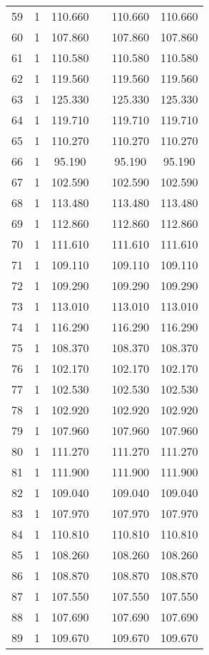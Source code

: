 \begin{table}[!htbp]
\begin{tabular}{@{\extracolsep{5pt}}lccccc}
59 & 1 & 110.660 &  & 110.660 & 110.660 \\ 
60 & 1 & 107.860 &  & 107.860 & 107.860 \\ 
61 & 1 & 110.580 &  & 110.580 & 110.580 \\ 
62 & 1 & 119.560 &  & 119.560 & 119.560 \\ 
63 & 1 & 125.330 &  & 125.330 & 125.330 \\ 
64 & 1 & 119.710 &  & 119.710 & 119.710 \\ 
65 & 1 & 110.270 &  & 110.270 & 110.270 \\ 
66 & 1 & 95.190 &  & 95.190 & 95.190 \\ 
67 & 1 & 102.590 &  & 102.590 & 102.590 \\ 
68 & 1 & 113.480 &  & 113.480 & 113.480 \\ 
69 & 1 & 112.860 &  & 112.860 & 112.860 \\ 
70 & 1 & 111.610 &  & 111.610 & 111.610 \\ 
71 & 1 & 109.110 &  & 109.110 & 109.110 \\ 
72 & 1 & 109.290 &  & 109.290 & 109.290 \\ 
73 & 1 & 113.010 &  & 113.010 & 113.010 \\ 
74 & 1 & 116.290 &  & 116.290 & 116.290 \\ 
75 & 1 & 108.370 &  & 108.370 & 108.370 \\ 
76 & 1 & 102.170 &  & 102.170 & 102.170 \\ 
77 & 1 & 102.530 &  & 102.530 & 102.530 \\ 
78 & 1 & 102.920 &  & 102.920 & 102.920 \\ 
79 & 1 & 107.960 &  & 107.960 & 107.960 \\ 
80 & 1 & 111.270 &  & 111.270 & 111.270 \\ 
81 & 1 & 111.900 &  & 111.900 & 111.900 \\ 
82 & 1 & 109.040 &  & 109.040 & 109.040 \\ 
83 & 1 & 107.970 &  & 107.970 & 107.970 \\ 
84 & 1 & 110.810 &  & 110.810 & 110.810 \\ 
85 & 1 & 108.260 &  & 108.260 & 108.260 \\ 
86 & 1 & 108.870 &  & 108.870 & 108.870 \\ 
87 & 1 & 107.550 &  & 107.550 & 107.550 \\ 
88 & 1 & 107.690 &  & 107.690 & 107.690 \\ 
89 & 1 & 109.670 &  & 109.670 & 109.670 \\ 

\end{tabular}
\end{table}
